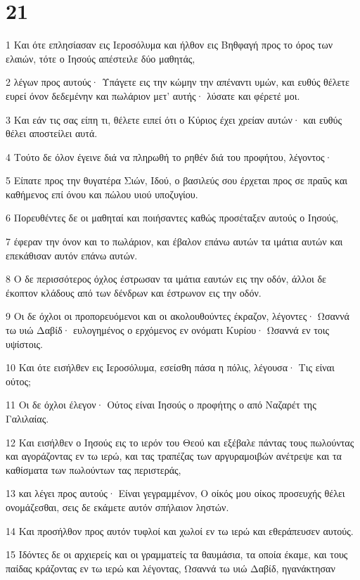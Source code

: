 \chapter{21}

\par 1 Και ότε επλησίασαν εις Ιεροσόλυμα και ήλθον εις Βηθφαγή προς το όρος των ελαιών, τότε ο Ιησούς απέστειλε δύο μαθητάς,
\par 2 λέγων προς αυτούς· Υπάγετε εις την κώμην την απέναντι υμών, και ευθύς θέλετε ευρεί όνον δεδεμένην και πωλάριον μετ' αυτής· λύσατε και φέρετέ μοι.
\par 3 Και εάν τις σας είπη τι, θέλετε ειπεί ότι ο Κύριος έχει χρείαν αυτών· και ευθύς θέλει αποστείλει αυτά.
\par 4 Τούτο δε όλον έγεινε διά να πληρωθή το ρηθέν διά του προφήτου, λέγοντος·
\par 5 Είπατε προς την θυγατέρα Σιών, Ιδού, ο βασιλεύς σου έρχεται προς σε πραΰς και καθήμενος επί όνου και πώλου υιού υποζυγίου.
\par 6 Πορευθέντες δε οι μαθηταί και ποιήσαντες καθώς προσέταξεν αυτούς ο Ιησούς,
\par 7 έφεραν την όνον και το πωλάριον, και έβαλον επάνω αυτών τα ιμάτια αυτών και επεκάθισαν αυτόν επάνω αυτών.
\par 8 Ο δε περισσότερος όχλος έστρωσαν τα ιμάτια εαυτών εις την οδόν, άλλοι δε έκοπτον κλάδους από των δένδρων και έστρωνον εις την οδόν.
\par 9 Οι δε όχλοι οι προπορευόμενοι και οι ακολουθούντες έκραζον, λέγοντες· Ωσαννά τω υιώ Δαβίδ· ευλογημένος ο ερχόμενος εν ονόματι Κυρίου· Ωσαννά εν τοις υψίστοις.
\par 10 Και ότε εισήλθεν εις Ιεροσόλυμα, εσείσθη πάσα η πόλις, λέγουσα· Τις είναι ούτος;
\par 11 Οι δε όχλοι έλεγον· Ούτος είναι Ιησούς ο προφήτης ο από Ναζαρέτ της Γαλιλαίας.
\par 12 Και εισήλθεν ο Ιησούς εις το ιερόν του Θεού και εξέβαλε πάντας τους πωλούντας και αγοράζοντας εν τω ιερώ, και τας τραπέζας των αργυραμοιβών ανέτρεψε και τα καθίσματα των πωλούντων τας περιστεράς,
\par 13 και λέγει προς αυτούς· Είναι γεγραμμένον, Ο οίκός μου οίκος προσευχής θέλει ονομάζεσθαι, σεις δε εκάμετε αυτόν σπήλαιον ληστών.
\par 14 Και προσήλθον προς αυτόν τυφλοί και χωλοί εν τω ιερώ και εθεράπευσεν αυτούς.
\par 15 Ιδόντες δε οι αρχιερείς και οι γραμματείς τα θαυμάσια, τα οποία έκαμε, και τους παίδας κράζοντας εν τω ιερώ και λέγοντας, Ωσαννά τω υιώ Δαβίδ, ηγανάκτησαν
